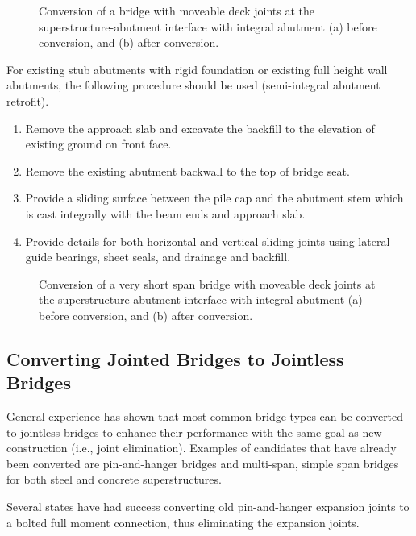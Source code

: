 \begin{figure}
  \caption{Conversion of a bridge with moveable deck joints at the superstructure-abutment interface with integral abutment (a) before conversion, and (b) after conversion.}
  \label{fig:conversion-moveable-integral}
\end{figure}

For existing stub abutments with rigid foundation or existing full height wall abutments, the following procedure should be used (semi-integral abutment retrofit).
\begin{enumerate}
  \item Remove the approach slab and excavate the backfill to the elevation of existing ground on front face.
  \item Remove the existing abutment backwall to the top of bridge seat.
  \item Provide a sliding surface between the pile cap and the abutment stem which is cast integrally with the
  beam ends and approach slab.
  \item Provide details for both horizontal and vertical sliding joints using lateral guide bearings, sheet seals, and
  drainage and backfill.
\end{enumerate}

\begin{figure}
  \caption{Conversion of a very short span bridge with moveable deck joints at the superstructure-abutment
  interface with integral abutment (a) before conversion, and (b) after conversion.}
  \label{fig:conversion-moveable-integral-short-span}
\end{figure}

\subsection{Converting Jointed Bridges to Jointless Bridges}
General experience has shown that most common bridge types can be converted to jointless bridges to enhance their performance with the same goal as new construction (i.e., joint elimination). Examples of candidates that have already been converted are pin-and-hanger bridges and multi-span, simple span bridges for both steel and concrete superstructures.

Several states have had success converting old pin-and-hanger expansion joints to a bolted full moment connection, thus eliminating the expansion joints.

